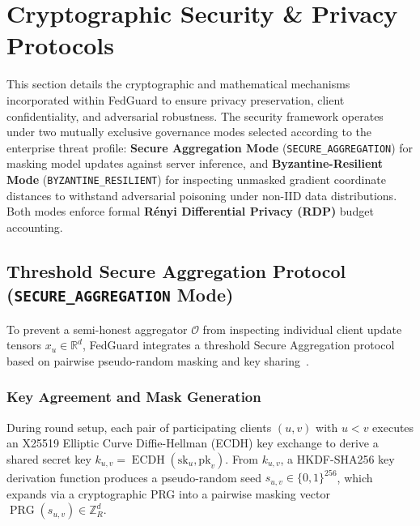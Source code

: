 \section{Cryptographic Security \& Privacy Protocols}
\label{sec:crypto_privacy}

This section details the cryptographic and mathematical mechanisms incorporated within FedGuard to ensure privacy preservation, client confidentiality, and adversarial robustness. The security framework operates under two mutually exclusive governance modes selected according to the enterprise threat profile: \textbf{Secure Aggregation Mode} (\texttt{SECURE\_AGGREGATION}) for masking model updates against server inference, and \textbf{Byzantine-Resilient Mode} (\texttt{BYZANTINE\_RESILIENT}) for inspecting unmasked gradient coordinate distances to withstand adversarial poisoning under non-IID data distributions. Both modes enforce formal \textbf{R\'enyi Differential Privacy (RDP)} budget accounting.

\subsection{Threshold Secure Aggregation Protocol (\texttt{SECURE\_AGGREGATION} Mode)}

To prevent a semi-honest aggregator $\mathcal{O}$ from inspecting individual client update tensors $x_u \in \mathbb{R}^d$, FedGuard integrates a threshold Secure Aggregation protocol based on pairwise pseudo-random masking and key sharing~\cite{bonawitz2017practical, so2021lightsecagg}.

\subsubsection{Key Agreement and Mask Generation}
During round setup, each pair of participating clients $(u, v)$ with $u < v$ executes an X25519 Elliptic Curve Diffie-Hellman (ECDH) key exchange to derive a shared secret key $k_{u,v} = \operatorname{ECDH}(\text{sk}_u, \text{pk}_v)$. From $k_{u,v}$, a HKDF-SHA256 key derivation function produces a pseudo-random seed $s_{u,v} \in \{0,1\}^{256}$, which expands via a cryptographic PRG into a pairwise masking vector $\operatorname{PRG}(s_{u,v}) \in \mathbb{Z}_R^d$.

